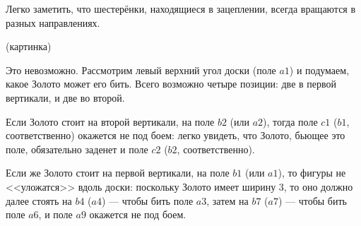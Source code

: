 \begin{itemize}
\itA Легко заметить, что шестерёнки, находящиеся в зацеплении, всегда вращаются в 
разных направлениях.

(картинка)

\itB 
%
%
Это невозможно. Рассмотрим левый верхний угол доски (поле $a1$) и подумаем, какое
Золото может его бить. Всего возможно четыре позиции: две в первой вертикали, и две во второй.

Если Золото стоит на второй вертикали, на поле $b2$ (или $a2$), тогда поле $c1$ ($b1$, 
соответственно) окажется не под боем: легко увидеть, что Золото, бьющее это поле, обязательно 
заденет и поле $c2$ ($b2$, соответственно).

\begin{center}\end{center}



Если же Золото стоит на первой вертикали, на поле $b1$ (или $a1$), то фигуры не <<уложатся>> вдоль доски: 
поскольку Золото имеет ширину 3, то оно должно далее стоять на $b4$ ($a4$) --- чтобы бить поле $a3$, 
затем на $b7$ ($a7$) --- чтобы бить поле $a6$, и поле $a9$ окажется не под боем.


\end{itemize}
